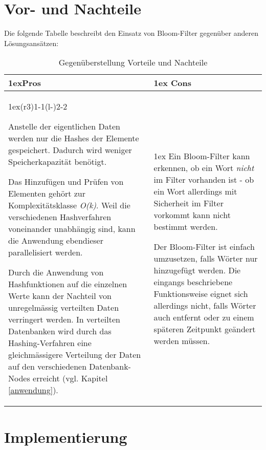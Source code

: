 \documentclass[10pt, a4paper, twocolumn]{article} %
\begin{document}
\section{Vor- und Nachteile}

Die folgende Tabelle beschreibt den Einsatz von Bloom-Filter gegenüber anderen Lösungsansätzen:

\begin{table}[h]
	\begin{tabularx}{\linewidth}{>{\parskip1ex}X@{\kern4\tabcolsep}>{\parskip1ex}X}
		\toprule
		\hfil\bfseries Pros
		&
		\hfil\bfseries Cons
		\\\cmidrule(r{3\tabcolsep}){1-1}\cmidrule(l{-\tabcolsep}){2-2}

		\lipsum[1] Anstelle der eigentlichen Daten werden nur die Hashes der Elemente gespeichert. Dadurch wird weniger Speicherkapazität benötigt.
		\par
		\lipsum[2] Das Hinzufügen und Prüfen von Elementen gehört zur Komplexitätsklasse \textit{O(k)}. Weil die verschiedenen Hashverfahren voneinander unabhängig sind, kann die Anwendung ebendieser parallelisiert werden.
		\par
		\lipsum[3] Durch die Anwendung von Hashfunktionen auf die einzelnen Werte kann der Nachteil von unregelmässig verteilten Daten verringert werden. In verteilten Datenbanken wird durch das Hashing-Verfahren eine gleichmässigere Verteilung der Daten auf den verschiedenen Datenbank-Nodes erreicht (vgl. Kapitel \ref{anwendung}).

		&
		\lipsum[1] Ein Bloom-Filter kann erkennen, ob ein Wort \textit{nicht} im Filter vorhanden ist - ob ein Wort allerdings mit Sicherheit im Filter vorkommt kann nicht bestimmt werden.
		\par
		\lipsum[2] Der Bloom-Filter ist einfach umzusetzen, falls Wörter nur hinzugefügt werden. Die eingangs beschriebene Funktionsweise eignet sich allerdings nicht, falls Wörter auch entfernt oder zu einem späteren Zeitpunkt geändert werden müssen.

		\\\bottomrule
	\end{tabularx}
	\caption{Gegenüberstellung Vorteile und Nachteile}
\end{table}

\section{Implementierung}
\end{document}
